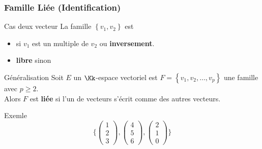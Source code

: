 \documentclass[dvipsnames]{beamer}
\begin{document}
\begin{frame}[t]
  \frametitle{Famille Liée (Identification)}
  \begin{block}{Cas deux vecteur}
    \small
    La famille $\left\{v_1, v_2\right\}$ est
    \begin{itemize}
      \item {} si $v_1$ est un multiple de $v_2$ ou
        \textbf{inversement}.\\[4pt]
      \item \textbf{\alert{libre}}  sinon
    \end{itemize}
  \end{block}
  \pause
  \begin{block}{Généralisation}
    \small
    Soit $E$ un $\Kk$-espace vectoriel est $F = \left\{v_1, v_2,\ldots,
    v_p\right\}$ une famille avec $p\geq 2$.\\

    Alors $F$ est \textbf{liée}  si
    l'un de vecteurs s'écrit comme \textbf{}
    des autres vecteurs.
  \end{block}
  
  \pause
  \begin{block}{Exemle}
  \scriptsize  
  \begin{equation*}
    \Big\{ 
      \begin{pmatrix}
       1\\2\\3 
      \end{pmatrix}
      ,
      \begin{pmatrix}
       4\\5\\6 
      \end{pmatrix}
      ,
      \begin{pmatrix}
       2\\1\\0 
      \end{pmatrix}
    \Big\}
  \end{equation*}
  \end{block}
\end{frame}
\end{document}
